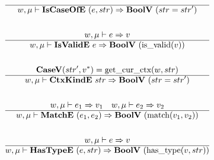 \begin{gather*}
  \hline
  w, \mu \vdash \iscaseofe ~ (e, str) \Rightarrow \boolv ~ (str = str') \\
%
\newline \\
  w, \mu \vdash e \Rightarrow v \\
  \hline
  w, \mu \vdash \isvalide ~ e \Rightarrow \boolv ~ (\isvalid(v)) \\
%
\newline \\
  \casev (str', \seq v) = \getcurctx(w, str) \\
  \hline
  w, \mu \vdash \ctxkinde ~ str \Rightarrow \boolv ~ (str = str') \\
%
\newline \\
  w, \mu \vdash e_1 \Rightarrow v_1 \quad
  w, \mu \vdash e_2 \Rightarrow v_2 \\
  \hline
  w, \mu \vdash \matche ~ (e_1, e_2) \Rightarrow \boolv ~ (\match(v_1, v_2)) \\
%
\newline \\
  w, \mu \vdash e \Rightarrow v \\
  \hline
  w, \mu \vdash \hastypee ~ (e, str) \Rightarrow \boolv ~ (\hastype(v, str)) \\
\end{gather*}





